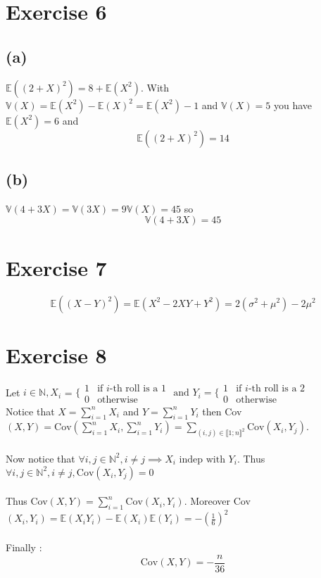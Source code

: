 \documentclass{article}
\begin{document}
    \section*{Exercise 6}
    \subsection*{(a)}
    $\mathbb{E}((2+X)^2 ) = 8 + \mathbb{E}(X^2)$. With $\mathbb{V}(X) = \mathbb{E}(X^2)-\mathbb{E}(X)^2 = \mathbb{E}(X^2) - 1$ and $\mathbb{V}(X) = 5$ you have $\mathbb{E}(X^2) = 6$ and $$\boxed{\mathbb{E}((2+X)^2) = 14}$$
    \subsection*{(b)}
    $\mathbb{V}(4+3X) = \mathbb{V}(3X) = 9\mathbb{V}(X) = 45$ so $$\boxed{\mathbb{V}(4+3X) = 45}$$
    \section*{Exercise 7}
    $$\boxed{\mathbb{E}((X-Y)^2) = \mathbb{E}(X^2-2XY+Y^2) = 2(\sigma^2+\mu^2)-2\mu^2}$$
    \section*{Exercise 8}
    Let $i\in\mathbb{N}, X_i$ = $\lbrace \begin{array}{cc}
        1& \text{if } i\text{-th roll is a 1}\\
        0& \text{otherwise}
    \end{array}\text{ and } Y_i = \lbrace \begin{array}{cc}
        1& \text{if } i\text{-th roll is a 2}\\
        0& \text{otherwise}
    \end{array}$\\
    Notice that $X = \sum\limits_{i=1}^n X_i$ and $Y = \sum\limits_{i=1}^n Y_i$ then Cov$(X,Y) =\text{Cov}(\sum\limits_{i=1}^n X_i,\sum\limits_{i=1}^n Y_i) = \sum\limits_{(i,j)\in\llbracket 1 ; n\rrbracket^2}\text{Cov}(X_i,Y_j) $.
    \\\\
    Now notice that $\forall i,j\in\mathbb{N}^2, i\neq j \implies X_i\text{ indep with } Y_i $. Thus $\forall i,j\in\mathbb{N}^2, i\neq j, \text{Cov}(X_i,Y_j) = 0$
    \\\\
    Thus Cov$(X,Y) = \sum\limits_{i=1}^n\text{Cov}(X_i,Y_i)$. Moreover Cov$(X_i,Y_i) = \mathbb{E}(X_iY_i)-\mathbb{E}(X_i)\mathbb{E}(Y_i) = -(\frac{1}{6})^2$
    \\\\
    Finally : $$\boxed{\text{Cov}(X,Y) = -\frac{n}{36}} $$
\end{document}
